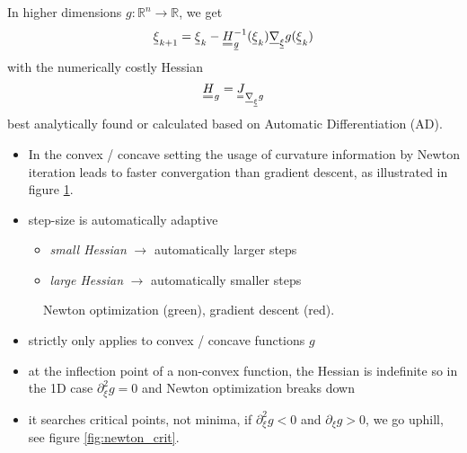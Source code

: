 In higher dimensions $g: \mathbb{R}^n \rightarrow \mathbb{R}$, we get
\begin{equation}
    \vec{\xi}_{k+1} = \vec{\xi}_k - \mat{H}_{\vec{g}}^{-1}(\vec{\xi}_k) \vec{\nabla}_{\vec{\xi}} g(\vec{\xi}_k)
\end{equation}
with the numerically costly Hessian
\begin{equation}
    \mat{H}_g = \mat{J}_{\vec{\nabla}_{\vec{\xi}} g}
\end{equation}
best analytically found or calculated based on Automatic 
Differentiation (AD).

\begin{itemize}
    \item In the convex / concave setting the usage of curvature information
    by Newton iteration leads to faster convergation than gradient descent, as
    illustrated in figure \ref{fig:newton_vs_gd}.
    \item step-size is automatically adaptive
    \begin{itemize}
        \item \textit{small Hessian} $\rightarrow$ automatically larger steps
        \item \textit{large Hessian} $\rightarrow$ automatically smaller steps
    \end{itemize}
\end{itemize}

\begin{figure}[!htb]
    \centering
    
    \caption{Newton optimization (\textcolor{green1}{green}), gradient descent (\textcolor{red1}{red}).}
    \label{fig:newton_vs_gd}
\end{figure}

\begin{itemize}
    \item strictly only applies to convex / concave functions $g$
    \item at the inflection point of a non-convex function, the Hessian is indefinite
    so in the 1D case $\partial_{\xi}^2 g = 0$ and Newton optimization breaks down
    \item it searches critical points, not minima, if $\partial_{\xi}^2 g < 0$ and $\partial_{\xi} g > 0$,
    we go uphill, see figure \ref{fig:newton_crit}.
\end{itemize}

